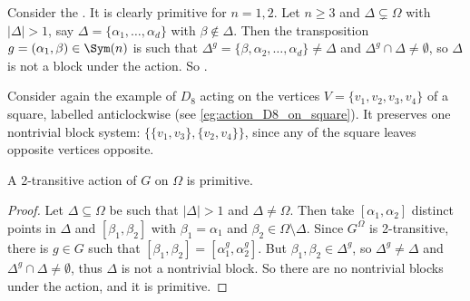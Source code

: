 
\begin{example}\label{eg:natural_action_Sn_blocks}
    Consider the . It is clearly primitive for $n = 1,2$. Let $n \geq 3$ and $\Delta \subsetneq \Omega$ with $|\Delta| > 1$, say $\Delta = \{\alpha_1,\dotsc,\alpha_d\}$ with $\beta \not\in \Delta$. Then the transposition $g = (\alpha_1,\beta) \in \Sym(n)$ is such that $\Delta^g = \{\beta,\alpha_2,\dotsc,\alpha_d\} \neq \Delta$ and $\Delta^g \cap \Delta \neq \emptyset$, so $\Delta$ is not a block under the action. So .
\end{example}

\begin{example}\label{eg:action_D8_on_square_blocks}
    Consider again the example of $D_8$ acting  on the vertices $V = \{v_1,v_2,v_3,v_4\}$ of a square, labelled anticlockwise (see \autoref{eg:action_D8_on_square}). It preserves one nontrivial block system: $\{\{v_1,v_3\},\{v_2,v_4\}\}$, since any  of the square leaves opposite vertices opposite. 
\end{example}

\begin{proposition}\label{prop:2-transitivity_implies_primitivity}
    A 2-transitive action of $G$ on $\Omega$ is primitive.
\end{proposition}

\begin{proof}
    Let $\Delta \subseteq \Omega$ be such that $|\Delta| > 1$ and $\Delta \neq \Omega$. Then take $[\alpha_1,\alpha_2]$ distinct points in $\Delta$ and $[\beta_1,\beta_2]$ with $\beta_1 = \alpha_1$ and $\beta_2 \in \Omega \setminus \Delta$. Since $G^\Omega$ is 2-transitive, there is $g \in G$ such that $[\beta_1,\beta_2] = [\alpha_1^g,\alpha_2^g]$. But $\beta_1,\beta_2 \in \Delta^g$, so $\Delta^g \neq \Delta$ and $\Delta^g \cap \Delta \neq \emptyset$, thus $\Delta$ is not a nontrivial block. So there are no nontrivial blocks under the action, and it is primitive.
\end{proof}

